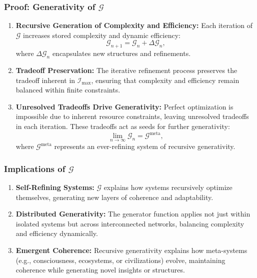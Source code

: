 \documentclass[12pt]{article}
\begin{document}
\subsubsection{Proof: Generativity of \(\mathcal{G}\)}
\begin{enumerate}
    \item \textbf{Recursive Generation of Complexity and Efficiency:}
    Each iteration of \(\mathcal{G}\) increases stored complexity and dynamic efficiency:
    \[
    \mathcal{G}_{n+1} = \mathcal{G}_n + \Delta \mathcal{G}_n,
    \]
    where \(\Delta \mathcal{G}_n\) encapsulates new structures and refinements.

    \item \textbf{Tradeoff Preservation:}
    The iterative refinement process preserves the tradeoff inherent in \(\mathcal{I}_{\text{max}}\), ensuring that complexity and efficiency remain balanced within finite constraints.

    \item \textbf{Unresolved Tradeoffs Drive Generativity:}
    Perfect optimization is impossible due to inherent resource constraints, leaving unresolved tradeoffs in each iteration. These tradeoffs act as seeds for further generativity:
    \[
    \lim_{n \to \infty} \mathcal{G}_n = \mathcal{G}^{\text{meta}},
    \]
    where \(\mathcal{G}^{\text{meta}}\) represents an ever-refining system of recursive generativity.
\end{enumerate}

\subsubsection{Implications of \(\mathcal{G}\)}
\begin{enumerate}
    \item \textbf{Self-Refining Systems:}
    \(\mathcal{G}\) explains how systems recursively optimize themselves, generating new layers of coherence and adaptability.
    \item \textbf{Distributed Generativity:}
    The generator function applies not just within isolated systems but across interconnected networks, balancing complexity and efficiency dynamically.
    \item \textbf{Emergent Coherence:}
    Recursive generativity explains how meta-systems (e.g., consciousness, ecosystems, or civilizations) evolve, maintaining coherence while generating novel insights or structures.
\end{enumerate}
\end{document}
